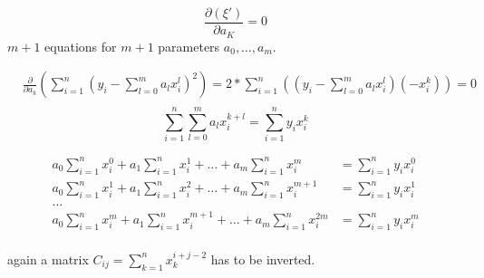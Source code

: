 \begin{equation*}
    \frac{\partial ( \xi ' ) }{\partial a_K} = 0
\end{equation*}
\textrightarrow{} $m+1$ equations for $m+1$ parameters $a_0, \ldots, a_m$.

\begin{align*}
    &\frac{\partial}{\partial a_k} \left(\sum_{i=1}^{n}(y_i-\sum_{l=0}^{m} a_l x_i^l)^2\right)
    = 2 * \sum_{i=1}^{n} \left(\left(y_i - \sum_{l=0}^{m} a_l x_i^l\right)(-x_i^k)\right)
    = 0 \\
\end{align*}
\begin{equation*}
    \sum_{i=1}^{n} \sum_{l=0}^{m} a_l x_i^{k+l} = \sum_{i=1}^{n} y_i x_i^k
\end{equation*}

\begin{align*}
    a_0 \sum_{i=1}^{n} x_i^0 + a_1 \sum_{i=1}^{n} x_i^1 + \ldots + a_m \sum_{i=1}^{n} x_i^m &= \sum_{i=1}^{n} y_i x_i^0\\
    a_0 \sum_{i=1}^{n} x_i^1 + a_1 \sum_{i=1}^{n} x_i^2 + \ldots + a_m \sum_{i=1}^{n} x_i^{m+1} &= \sum_{i=1}^{n} y_i x_i^1\\
    \ldots \\
    a_0 \sum_{i=1}^{n} x_i^m + a_1 \sum_{i=1}^{n} x_i^{m+1} + \ldots + a_m \sum_{i=1}^{n} x_i^{2m} &= \sum_{i=1}^{n} y_i x_i^m\\
\end{align*}

again a matrix $C_{ij} = \sum_{k=1}^{n} x_k^{i+j-2}$ has to be inverted.

